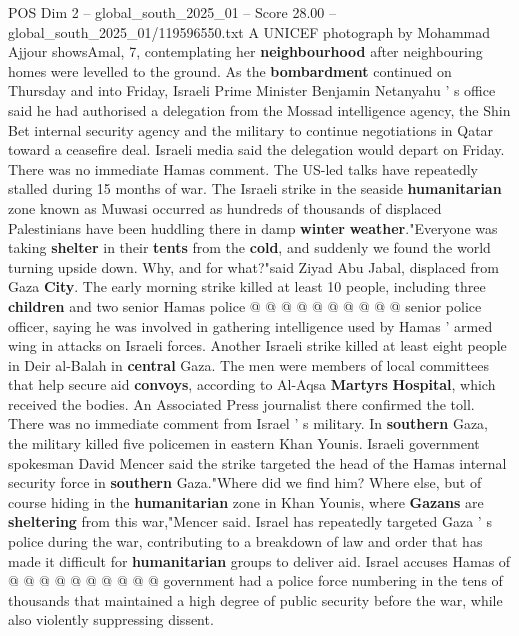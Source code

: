 \begin{textsample}{POS Dim 2 – global\_south\_2025\_01 – Score 28.00 – global\_south\_2025\_01/119596550.txt}  \label{ex:f2_pos_312}
A UNICEF photograph by Mohammad Ajjour showsAmal, 7, contemplating her \textbf{neighbourhood} after neighbouring homes were levelled to the ground.
As the \textbf{bombardment} continued on Thursday and into Friday, Israeli Prime Minister Benjamin Netanyahu ' s office said he had authorised a delegation from the Mossad intelligence agency, the Shin Bet internal security agency and the military to continue negotiations in Qatar toward a ceasefire deal.
Israeli media said the delegation would depart on Friday.
There was no immediate Hamas comment.
The US-led talks have repeatedly stalled during 15 months of war.
The Israeli strike in the seaside \textbf{humanitarian} zone known as Muwasi occurred as hundreds of thousands of displaced Palestinians have been huddling there in damp \textbf{winter} \textbf{weather}."Everyone was taking \textbf{shelter} in their \textbf{tents} from the \textbf{cold}, and suddenly we found the world turning upside down.
Why, and for what?"said Ziyad Abu Jabal, displaced from Gaza \textbf{City}.
The early morning strike killed at least 10 people, including three \textbf{children} and two senior Hamas police @ @ @ @ @ @ @ @ @ @ senior police officer, saying he was involved in gathering intelligence used by Hamas ' armed wing in attacks on Israeli forces.
Another Israeli strike killed at least eight people in Deir al-Balah in \textbf{central} Gaza.
The men were members of local committees that help secure aid \textbf{convoys}, according to Al-Aqsa \textbf{Martyrs} \textbf{Hospital}, which received the bodies.
An Associated Press journalist there confirmed the toll.
There was no immediate comment from Israel ' s military.
In \textbf{southern} Gaza, the military killed five policemen in eastern Khan Younis.
Israeli government spokesman David Mencer said the strike targeted the head of the Hamas internal security force in \textbf{southern} Gaza."Where did we find him?
Where else, but of course hiding in the \textbf{humanitarian} zone in Khan Younis, where \textbf{Gazans} are \textbf{sheltering} from this war,"Mencer said.
Israel has repeatedly targeted Gaza ' s police during the war, contributing to a breakdown of law and order that has made it difficult for \textbf{humanitarian} groups to deliver aid.
Israel accuses Hamas of @ @ @ @ @ @ @ @ @ @ government had a police force numbering in the tens of thousands that maintained a high degree of public security before the war, while also violently suppressing dissent.

\end{textsample}
